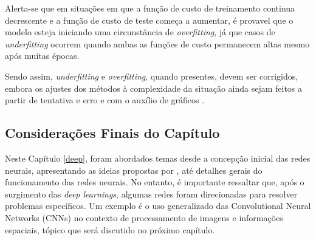 Alerta-se que em situações em que a função de custo de treinamento continua decrescente e a função de custo de teste começa a aumentar, é provavel que o modelo esteja iniciando uma circunstância de \textit{overfitting}, já que casos de \textit{underfitting} ocorrem quando ambas as funções de custo permanecem altas mesmo após muitas épocas.

Sendo assim, \textit{underfitting} e \textit{overfitting}, quando presentes, devem ser corrigidos, embora os ajustes dos métodos à complexidade da situação ainda sejam feitos a partir de tentativa e erro e com o auxílio de gráficos \citep{Goodfellow2016}.

\subsection{Considerações Finais do Capítulo}
\label{deep:conclusion}

Neste Capítulo \ref{deep}, foram abordados temas desde a concepção inicial das redes neurais, apresentando as ideias propostas por \cite{mcculloch1943logical}, até detalhes gerais do funcionamento das redes neurais. No entanto, é importante ressaltar que, após o surgimento das \textit{deep learnings}, algumas redes foram direcionadas para resolver problemas específicos. Um exemplo é o uso generalizado das Convolutional Neural Networks (CNNs) no contexto de processamento de imagens e informações espaciais, tópico que será discutido no próximo capítulo.